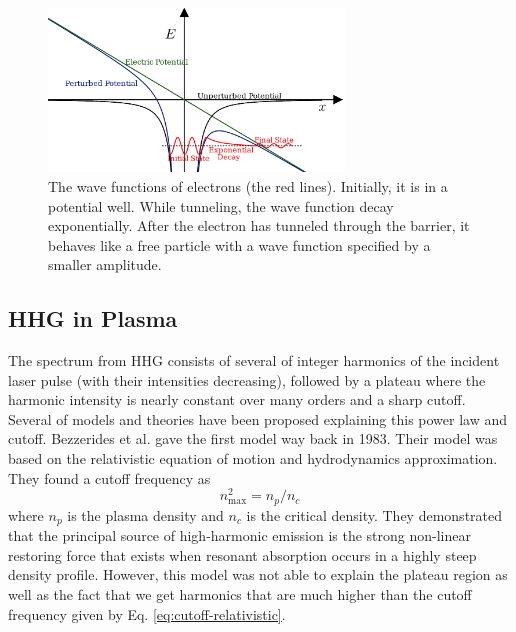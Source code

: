 \documentclass[12pt]{article}
\begin{document}
\begin{figure}[h]
    \centering
    \includegraphics[width=0.7\textwidth]{images/three_step_two.png}
    \caption{The wave functions of electrons (the red lines). Initially, it is in a potential well. While tunneling, the wave function decay exponentially. After the electron has tunneled through the barrier, it behaves like a free particle with a wave function specified by a smaller amplitude.}
    \label{fig:3-step-2}
\end{figure}

\subsection{HHG in Plasma}
The spectrum from HHG consists of several of integer harmonics of the incident laser pulse (with their intensities decreasing), followed by a plateau where the harmonic intensity is nearly constant over many orders and a sharp cutoff. Several of models and theories have been proposed explaining this power law and cutoff. Bezzerides et al.\cite{hhg-relativistic} gave the first model way back in 1983. Their model was based on the relativistic equation of motion and hydrodynamics approximation. They found a cutoff frequency as
\begin{equation}
    \label{eq:cutoff-relativistic}
    n_{\max}^2 = n_p/n_c
\end{equation}
where $n_p$ is the plasma density and $n_c$ is the critical density. They demonstrated that the principal source of high-harmonic emission is the strong non-linear restoring force that exists when resonant absorption occurs in a highly steep density profile. However, this model was not able to explain the plateau region as well as the fact that we get harmonics that are much higher than the cutoff frequency given by Eq. \ref{eq:cutoff-relativistic}.
\end{document}
